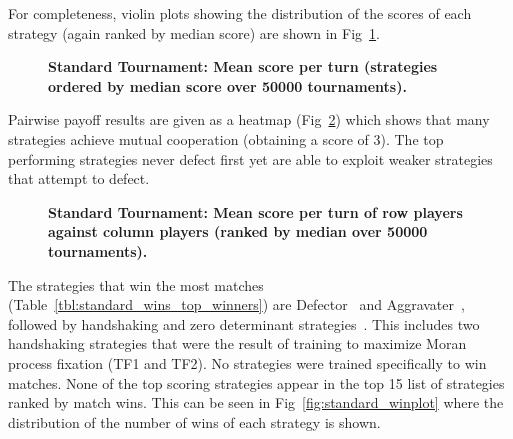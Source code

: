 \documentclass[10pt,letterpaper]{article}
\begin{document}
For completeness, violin plots showing the distribution of the scores of each
strategy (again ranked by median score) are shown in
Fig~\ref{fig:standard_boxplot}.

\begin{figure}[!hbtp]
    \centering
    \caption{\bf Standard Tournament: Mean score per turn 
        (strategies ordered by median score over 50000 tournaments).}
    \label{fig:standard_boxplot}
\end{figure}

Pairwise payoff results are given as a heatmap (Fig~\ref{fig:standard_heatmap})
which shows that many strategies achieve mutual cooperation (obtaining a score
of 3). The top performing
strategies never defect first yet are able to exploit weaker strategies that
attempt to defect.

\begin{figure}[!hbtp]
    \centering
    \caption{\bf Standard Tournament: Mean score per turn of row players against
    column players (ranked by median over 50000 tournaments).}
    \label{fig:standard_heatmap}
\end{figure}

The strategies that win the most matches
(Table~\ref{tbl:standard_wins_top_winners}) are Defector~\cite{Axelrod1984} and Aggravater~\cite{axelrodproject}, followed
by handshaking and zero determinant strategies~\cite{Press2012}.
This includes two handshaking
strategies that were the result of training to maximize Moran process fixation
(TF1 and TF2). No strategies were trained specifically to win matches. None of
the top scoring strategies appear in the top 15 list of strategies ranked by
match wins. This can be seen in Fig~\ref{fig:standard_winplot} where the
distribution of the number of wins of each strategy is shown.
\end{document}
